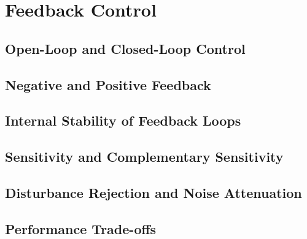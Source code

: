 \chapter{Feedback Control} \label{ch:feedback}

    \section{Open-Loop and Closed-Loop Control}

	\section{Negative and Positive Feedback}

	\section{Internal Stability of Feedback Loops}
    	
    \section{Sensitivity and Complementary Sensitivity}
    
    \section{Disturbance Rejection and Noise Attenuation}

	\section{Performance Trade-offs}